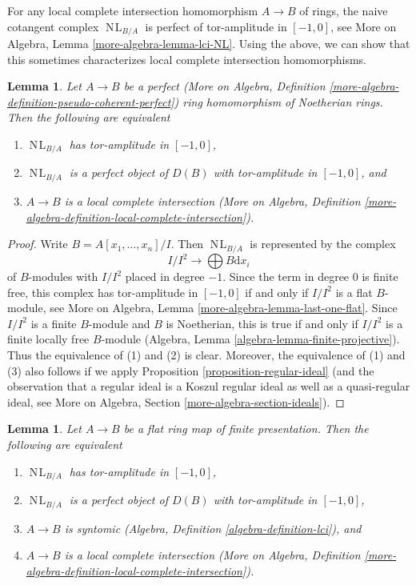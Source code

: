 \documentclass{stacks-project}
\theoremstyle{plain}
\newtheorem{lemma}[subsection]{Lemma}
\theoremstyle{definition}
\theoremstyle{remark}
\numberwithin{equation}{subsection}
\def\NL{\mathop{N\!L}\nolimits}
\begin{document}
\noindent
For any local complete intersection homomorphism $A \to B$
of rings, the naive cotangent complex $\NL_{B/A}$ is perfect
of tor-amplitude in $[-1, 0]$, see
More on Algebra, Lemma \ref{more-algebra-lemma-lci-NL}.
Using the above, we can show that this sometimes
characterizes local complete intersection homomorphisms.

\begin{lemma}
\label{lemma-perfect-NL-lci}
Let $A \to B$ be a perfect (More on Algebra, Definition
\ref{more-algebra-definition-pseudo-coherent-perfect})
ring homomorphism of Noetherian rings. Then the following are equivalent
\begin{enumerate}
\item $\NL_{B/A}$ has tor-amplitude in $[-1, 0]$,
\item $\NL_{B/A}$ is a perfect object of $D(B)$
with tor-amplitude in $[-1, 0]$, and
\item $A \to B$ is a local complete intersection
(More on Algebra, Definition
\ref{more-algebra-definition-local-complete-intersection}).
\end{enumerate}
\end{lemma}

\begin{proof}
Write $B = A[x_1, \ldots, x_n]/I$. Then $\NL_{B/A}$ is represented by
the complex
$$
I/I^2 \longrightarrow \bigoplus B \text{d}x_i
$$
of $B$-modules with $I/I^2$ placed in degree $-1$. Since the term in
degree $0$ is finite free, this complex has tor-amplitude in $[-1, 0]$ if and
only if $I/I^2$ is a flat $B$-module, see
More on Algebra, Lemma \ref{more-algebra-lemma-last-one-flat}.
Since $I/I^2$ is a finite $B$-module and $B$ is Noetherian, this is true
if and only if $I/I^2$ is a finite locally free $B$-module
(Algebra, Lemma \ref{algebra-lemma-finite-projective}).
Thus the equivalence of (1) and (2) is clear. Moreover, the equivalence
of (1) and (3) also follows if we apply
Proposition \ref{proposition-regular-ideal}
(and the observation that a regular ideal is a Koszul regular
ideal as well as a quasi-regular ideal, see
More on Algebra, Section \ref{more-algebra-section-ideals}).
\end{proof}

\begin{lemma}
\label{lemma-flat-fp-NL-lci}
Let $A \to B$ be a flat ring map of finite presentation.
Then the following are equivalent
\begin{enumerate}
\item $\NL_{B/A}$ has tor-amplitude in $[-1, 0]$,
\item $\NL_{B/A}$ is a perfect object of $D(B)$
with tor-amplitude in $[-1, 0]$,
\item $A \to B$ is syntomic
(Algebra, Definition \ref{algebra-definition-lci}), and
\item $A \to B$ is a local complete intersection
(More on Algebra, Definition
\ref{more-algebra-definition-local-complete-intersection}).
\end{enumerate}
\end{lemma}
\end{document}
